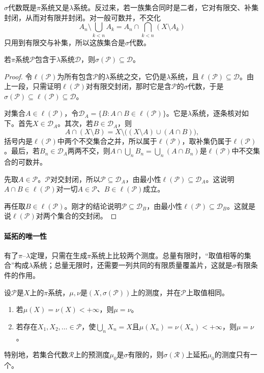 $\sigma$代数既是$\pi$系统又是$\lambda$系统。反过来，若一族集合同时是二者，它对有限交、补集封闭，从而对有限并封闭。对一般可数并，不交化
\[
 A_n\setminus\bigcup_{k<n}A_k=A_n\cap\bigcap_{k<n}(X\setminus A_k)
\]
只用到有限交与补集，所以这族集合是$\sigma$代数。

\begin{theorem}[$\pi$--$\lambda$定理]
\label{thm:meas-pi-lambda}
若$\pi$系统$\mathcal P$包含于$\lambda$系统$\mathcal D$，则$\sigma(\mathcal P)\subseteq\mathcal D$。
\end{theorem}

\begin{proof}
令$\ell(\mathcal P)$为所有包含$\mathcal P$的$\lambda$系统之交，它仍是$\lambda$系统，且$\ell(\mathcal P)\subseteq\mathcal D$。由上一段，只需证明$\ell(\mathcal P)$对有限交封闭，那时它是含$\mathcal P$的$\sigma$代数，于是$\sigma(\mathcal P)\subseteq\ell(\mathcal P)\subseteq\mathcal D$。

对集合$A\in\ell(\mathcal P)$，令$\mathcal D_A=\{B:A\cap B\in\ell(\mathcal P)\}$。它是$\lambda$系统，逐条核对如下。首先$X\in\mathcal D_A$。其次，若$B\in\mathcal D_A$，则
\[
 A\cap(X\setminus B)=X\setminus\bigl((X\setminus A)\cup(A\cap B)\bigr),
\]
括号内是$\ell(\mathcal P)$中两个不交集合之并，所以属于$\ell(\mathcal P)$，取补集仍属于$\ell(\mathcal P)$。最后，若$B_n\in\mathcal D_A$两两不交，则$A\cap\bigcup_nB_n=\bigcup_n(A\cap B_n)$是$\ell(\mathcal P)$中不交集合的可数并。

先取$A\in\mathcal P$。$\mathcal P$对交封闭，所以$\mathcal P\subseteq\mathcal D_A$，由最小性$\ell(\mathcal P)\subseteq\mathcal D_A$。这说明$A\cap B\in\ell(\mathcal P)$对一切$A\in\mathcal P$、$B\in\ell(\mathcal P)$成立。

再任取$B\in\ell(\mathcal P)$。刚才的结论说明$\mathcal P\subseteq\mathcal D_B$，由最小性$\ell(\mathcal P)\subseteq\mathcal D_B$。这就是说$\ell(\mathcal P)$对两个集合的交封闭。
\end{proof}

\paragraph{延拓的唯一性}
有了$\pi$--$\lambda$定理，只需在生成$\pi$系统上比较两个测度。总量有限时，“取值相等的集合”构成$\lambda$系统；总量无限时，还需要一列共同的有限质量覆盖片，这就是$\sigma$有限条件的作用。

\begin{theorem}[生成$\pi$系统上的唯一性]
\label{thm:meas-uniqueness}
设$\mathcal P$是$X$上的$\pi$系统，$\mu,\nu$是$(X,\sigma(\mathcal P))$上的测度，并在$\mathcal P$上取值相同。
\begin{enumerate}
 \item 若$\mu(X)=\nu(X)<+\infty$，则$\mu=\nu$。
 \item 若存在$X_1,X_2,\dots\in\mathcal P$，使$\bigcup_nX_n=X$且$\mu(X_n)=\nu(X_n)<+\infty$，则$\mu=\nu$。
\end{enumerate}
特别地，若集合代数$\mathcal R$上的预测度$\mu_0$是$\sigma$有限的，则$\sigma(\mathcal R)$上延拓$\mu_0$的测度只有一个。
\end{theorem}

